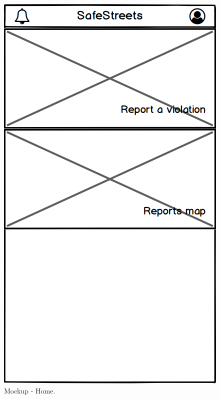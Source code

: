 \begin{@empty}
\begin{figure}[H]
\centering
\begin{minipage}{.4\textwidth}
    \centering
    \includegraphics[width=.8\textwidth]{Images/home.png}
    \caption{\label{fig:mockup-home}Mockup - Home.}
\end{minipage}
\begin{minipage}{.4\textwidth}
    \centering

\end{minipage}
\end{figure}
\end{@empty}
